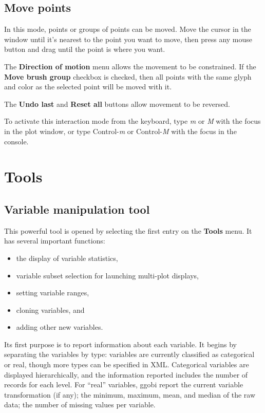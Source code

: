 \documentclass[11pt]{article}
\def\Widget#1{\textbf{#1}}
\begin{document}
\subsection{Move points}
\label{slbl:MovePoints}

In this mode, points or groups of points can be moved.  Move
the cursor in the window until it's nearest to the point you
want to move, then press any mouse button and drag until the
point is where you want.

The \Widget{Direction of motion} menu allows the movement to be
constrained.  If the \Widget{Move brush group} checkbox is
checked, then all points with the same glyph and color as
the selected point will be moved with it.

The \Widget{Undo last} and \Widget{Reset all} buttons allow movement
to be reversed.

To activate this interaction mode from the keyboard, type {\em m} or
{\em M} with the focus in the plot window, or type Control-{\em m} or
Control-{\em M} with the focus in the console.

\newpage
\section{Tools}
\label{Tools}

\subsection{Variable manipulation tool}
\label{slbl:VarManip}

This powerful tool is opened by selecting the first entry on the
\Widget{Tools} menu.  It has several important functions:
\begin{itemize} \itemsep 0em
\item the display of variable statistics,
\item variable subset selection for launching multi-plot displays,
\item setting variable ranges,
\item cloning variables, and
\item adding other new variables.
\end{itemize}

Its first purpose is to report information about each variable.
It begins by separating the variables by type: variables are
currently classified as categorical or real, though more types
can be specified in XML.  Categorical variables are displayed
hierarchically, and the information reported includes the number
of records for each level.  For ``real'' variables, ggobi report
the current variable transformation (if any); the minimum,
maximum, mean, and median of the raw data; the number of missing values
per variable.
\end{document}
